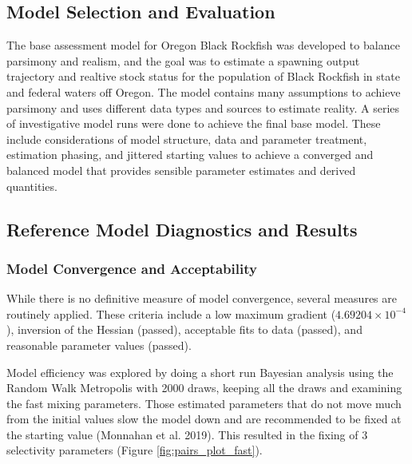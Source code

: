\documentclass[11pt,
  english,
  letterpaper,
]{article}
\begin{document}
\hypertarget{model-selection-and-evaluation}{%
\subsection{Model Selection and Evaluation}\label{model-selection-and-evaluation}}

The base assessment model for Oregon Black Rockfish was developed to balance parsimony and realism, and the goal was to estimate a spawning output trajectory and realtive stock status for the population of Black Rockfish in state and federal waters off Oregon. The model contains many assumptions to achieve parsimony and uses different data types and sources to estimate reality. A series of investigative model runs were done to achieve the final base model. These include considerations of model structure, data and parameter treatment, estimation phasing, and jittered starting values to achieve a converged and balanced model that provides sensible parameter estimates and derived quantities.

\hypertarget{reference-model-diagnostics-and-results}{%
\subsection{Reference Model Diagnostics and Results}\label{reference-model-diagnostics-and-results}}

\hypertarget{model-convergence-and-acceptability}{%
\subsubsection{Model Convergence and Acceptability}\label{model-convergence-and-acceptability}}

While there is no definitive measure of model convergence, several measures are routinely applied. These criteria include a low maximum gradient (\ensuremath{4.69204\times 10^{-4}}), inversion of the Hessian (passed), acceptable fits to data (passed), and reasonable parameter values (passed).

Model efficiency was explored by doing a short run Bayesian analysis using the Random Walk Metropolis with 2000 draws, keeping all the draws and examining the fast mixing parameters. Those estimated parameters that do not move much from the initial values slow the model down and are recommended to be fixed at the starting value (Monnahan et al. 2019). This resulted in the fixing of 3 selectivity parameters (Figure \ref{fig:pairs_plot_fast}).
\end{document}
